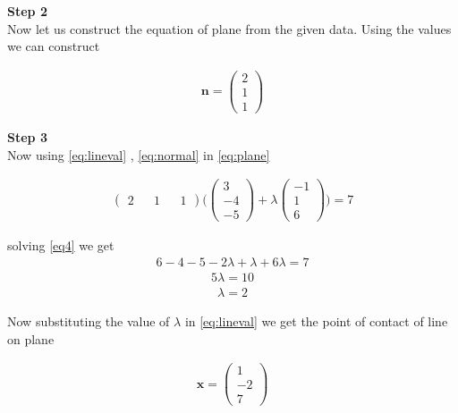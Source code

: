 \documentclass[10pt,a4paper,twocolumn]{article}
\newcommand{\myvec}[1]{\ensuremath{\begin{pmatrix}#1\end{pmatrix}}}
\numberwithin{equation}{section}
\begin{document}
\textbf{Step 2}\\
Now let us construct the equation of plane from the given data.
Using the values we can construct 

\begin{align}
\textbf{n}=\myvec{ 2\\ 1\\1}\label{eq:normal}
\end{align}

\textbf{Step 3}\\
Now using \eqref{eq:lineval} , \eqref{eq:normal}   in \eqref{eq:plane}

\begin{align}
\myvec{ 2 && 1 && 1} \Bigg( \myvec{3 \\-4 \\-5}+\lambda\myvec{-1 \\1 \\6} \Bigg)=7\label{eq4}
\end{align}

solving \eqref{eq4} we get 
\begin{align}  
6 -4 -5-2\lambda+ \lambda+ 6 \lambda=7 
\end{align}
\begin{align} 
5 \lambda=10 
\end{align}
\begin{align}
\lambda=2 \label{eq5} 
\end{align}

Now substituting the value of $\lambda$ in \eqref{eq:lineval} we get the point of contact of line on plane


\begin{align}
\textbf{x}=\myvec{1\\-2\\7 }
\end{align}
\pagebreak
\end{document}
